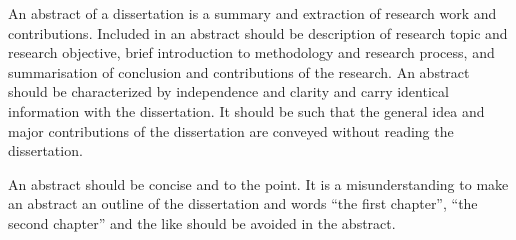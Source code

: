 \begin{eabstract}

An abstract of a dissertation is a summary and extraction of research work
     and contributions. Included in an abstract should be description of research
     topic and research objective, brief introduction to methodology and research
     process, and summarisation of conclusion and contributions of the
     research. An abstract should be characterized by independence and clarity and
     carry identical information with the dissertation. It should be such that the
     general idea and major contributions of the dissertation are conveyed without
     reading the dissertation.
  
     An abstract should be concise and to the point. It is a misunderstanding to
     make an abstract an outline of the dissertation and words ``the first
     chapter'', ``the second chapter'' and the like should be avoided in the
     abstract.
    
\end{eabstract}

